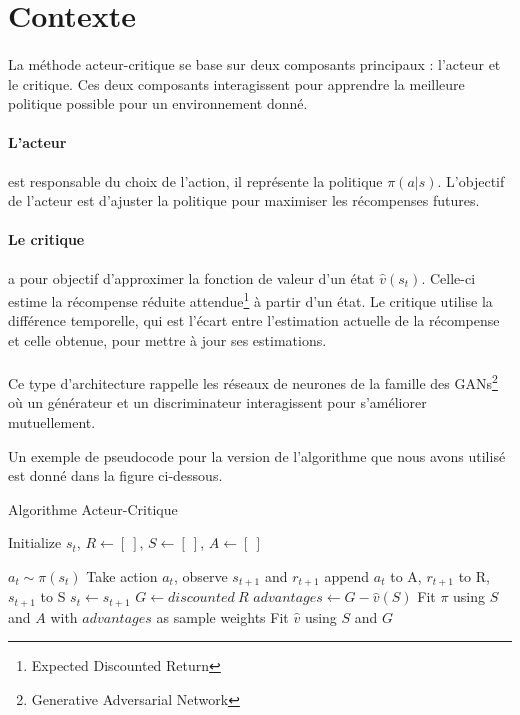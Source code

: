 \section{Contexte}

\paragraph{}
La méthode acteur-critique se base sur deux composants principaux : l'acteur et le critique. 
Ces deux composants interagissent pour apprendre la meilleure politique possible pour un environnement donné.

\paragraph{L'acteur} est responsable du choix de l'action, il représente la politique $\pi(a|s)$. 
L'objectif de l'acteur est d'ajuster la politique pour maximiser les récompenses futures.

\paragraph{Le critique} a pour objectif d'approximer la fonction de valeur d'un état $\hat{v}(s_t)$. 
Celle-ci estime la récompense réduite attendue\footnote{Expected Discounted Return} à partir d'un état.
Le critique utilise la différence temporelle, 
qui est l'écart entre l'estimation actuelle de la récompense et celle obtenue, pour mettre à jour ses estimations.

\paragraph{}
Ce type d'architecture rappelle les réseaux de neurones de la famille des GANs\footnote{Generative Adversarial Network} 
où un générateur et un discriminateur interagissent pour s'améliorer mutuellement.

Un exemple de pseudocode pour la version de l'algorithme que nous avons utilisé est donné dans la figure ci-dessous.
\begin{algorithm}
\caption{Algorithme Acteur-Critique}\label{alg:a2c}
\begin{algorithmic}

\State Initialize $s_t$, $R \gets [~]$, $S \gets [~]$, $A \gets [~]$

\State $a_t \sim \pi(s_t)$ 
  \State Take action $a_t$, observe $s_{t+1}$ and $r_{t+1}$
\State append $a_t$ to A, $r_{t+1}$ to R, $s_{t+1}$ to S
  \State $s_t \gets s_{t+1}$
\EndFor
\State $G \gets discounted~R$
\State $advantages \gets G - \hat{v}(S)$
\State Fit $\pi$ using \(S\) and \(A\) with $advantages$ as sample weights
\State Fit $\hat{v}$ using \(S\) and \(G\)
\EndFor
\end{algorithmic}
\end{algorithm}

